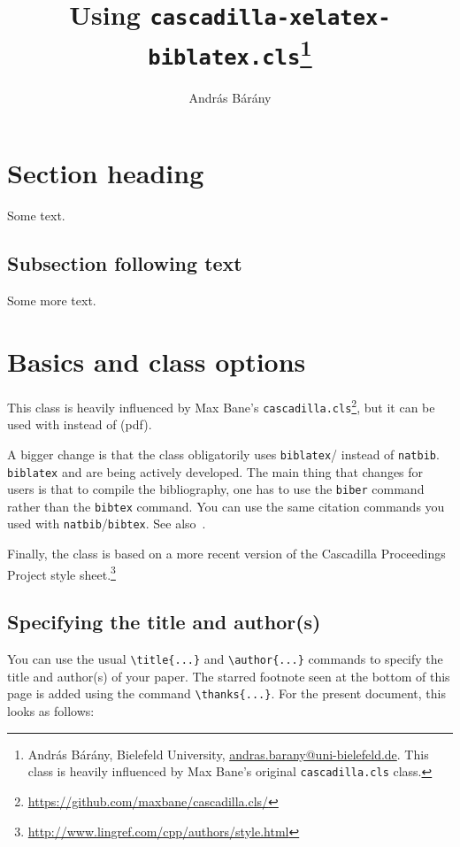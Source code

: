 \documentclass[usegb4e]{cascadilla-xelatex-biblatex}
\title{Using \texttt{cascadilla-xelatex-biblatex.cls}\thanks{András Bárány,
        Bielefeld University,
\url{andras.barany@uni-bielefeld.de}. This class is heavily influenced by Max
Bane's original \texttt{cascadilla.cls} class.}}
\author{András Bárány}
\begin{document}
\maketitle

\section{Section heading}


Some text.

\subsection{Subsection following text}


Some more text.

\section{Basics and class options}

This class is heavily influenced by Max Bane's
\texttt{cascadilla.cls}\footnote{\url{https://github.com/maxbane/cascadilla.cls/}},
but it can be used with  instead of (pdf).

A bigger change is that the class obligatorily uses
\texttt{biblatex}/ instead of \texttt{natbib}. \texttt{biblatex}
and  are being actively developed. The main thing that changes
for users is that to compile the bibliography, one has to use the
\texttt{biber} command rather than the \texttt{bibtex} command. You can use the
same citation commands you used with \texttt{natbib}/\texttt{bibtex}. See
also~.

Finally, the class is based on a more recent version of the Cascadilla
Proceedings Project style
sheet.\footnote{\url{http://www.lingref.com/cpp/authors/style.html}}

\subsection{Specifying the title and author(s)}

You can use the usual \verb+\title{...}+ and \verb+\author{...}+ commands to
specify the title and author(s) of your paper. The starred footnote seen at the
bottom of this page is added using the command \verb+\thanks{...}+. For the
present document, this looks as follows:
\end{document}
